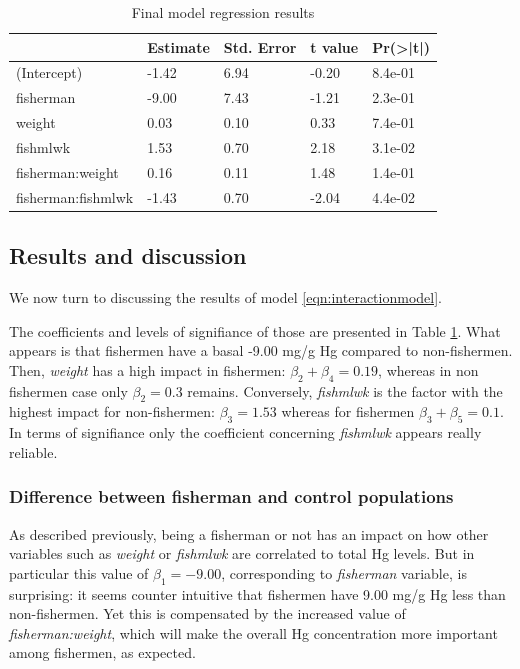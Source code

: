 \documentclass[12pt,]{article}
\begin{document}
\begin{table}[t]

\caption{\label{tab:unnamed-chunk-14}\label{tbl:interactionmodel}Final model regression results}
\centering
\begin{tabular}{l|l|l|l|l}
\hline
  & Estimate & Std. Error & t value & Pr(>|t|)\\
\hline
\rowcolor{gray!6}  (Intercept) & -1.42 & 6.94 & -0.20 & 8.4e-01\\
\hline
fisherman & -9.00 & 7.43 & -1.21 & 2.3e-01\\
\hline
\rowcolor{gray!6}  weight & 0.03 & 0.10 & 0.33 & 7.4e-01\\
\hline
fishmlwk & 1.53 & 0.70 & 2.18 & 3.1e-02\\
\hline
\rowcolor{gray!6}  fisherman:weight & 0.16 & 0.11 & 1.48 & 1.4e-01\\
\hline
fisherman:fishmlwk & -1.43 & 0.70 & -2.04 & 4.4e-02\\
\hline
\end{tabular}
\end{table}

\subsection{Results and discussion}\label{results-and-discussion}

We now turn to discussing the results of model
\ref{eqn:interactionmodel}.

The coefficients and levels of signifiance of those are presented in
Table \ref{tbl:interactionmodel}. What appears is that fishermen have a
basal -9.00 mg/g Hg compared to non-fishermen. Then, \emph{weight} has a
high impact in fishermen: \(\beta_2+\beta_4 = 0.19\), whereas in non
fishermen case only \(\beta_2 = 0.3\) remains. Conversely,
\emph{fishmlwk} is the factor with the highest impact for non-fishermen:
\(\beta_3 = 1.53\) whereas for fishermen \(\beta_3+\beta_5 = 0.1\). In
terms of signifiance only the coefficient concerning \emph{fishmlwk}
appears really reliable.

\subsubsection{Difference between fisherman and control
populations}\label{difference-between-fisherman-and-control-populations}

As described previously, being a fisherman or not has an impact on how
other variables such as \emph{weight} or \emph{fishmlwk} are correlated
to total Hg levels. But in particular this value of \(\beta_1 = -9.00\),
corresponding to \emph{fisherman} variable, is surprising: it seems
counter intuitive that fishermen have 9.00 mg/g Hg less than
non-fishermen. Yet this is compensated by the increased value of
\emph{fisherman:weight}, which will make the overall Hg concentration
more important among fishermen, as expected.
\end{document}
